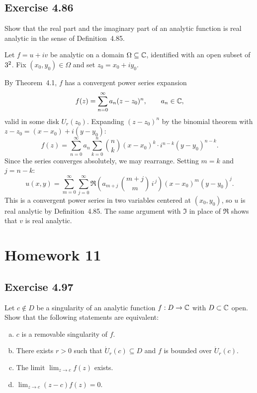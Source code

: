 \documentclass{article}
\begin{document}
\subsection{Exercise 4.86}

Show that the real part and the imaginary part of an analytic function
is real analytic in the sense of Definition~4.85.

\begin{solution}
  Let $f = u + iv$ be analytic on a domain $\Omega \subseteq \mathbb{C}$,
  identified with an open subset of $3^2$. Fix $(x_0, y_0) \in \Omega$
  and set $z_0 = x_0 + iy_0$.

  By Theorem~4.1, $f$ has a convergent power series expansion
  \[
    f(z) = \sum_{n=0}^{\infty} a_n (z - z_0)^n,
    \qquad a_n \in \mathbb{C},
  \]
  valid in some disk $U_r(z_0)$. Expanding $(z - z_0)^n$ by the
  binomial theorem with $z - z_0 = (x - x_0) + i(y - y_0)$:
  \[
    f(z) = \sum_{n=0}^{\infty} a_n
    \sum_{k=0}^{n} \binom{n}{k}
    (x - x_0)^k \cdot i^{n-k}(y - y_0)^{n-k}.
  \]
  Since the series converges absolutely, we may rearrange. Setting
  $m = k$ and $j = n - k$:
  \[
    u(x,y) = \sum_{m=0}^{\infty} \sum_{j=0}^{\infty}
    \Re\!\left(a_{m+j}\,\binom{m+j}{m}\,i^{\,j}\right)
    (x - x_0)^m (y - y_0)^j.
  \]
  This is a convergent power series in two variables centered at
  $(x_0, y_0)$, so $u$ is real analytic by Definition~4.85.
  The same argument with $\Im$ in place of $\Re$ shows that $v$ is
  real analytic.
\end{solution}

\section{Homework 11}

\subsection{Exercise 4.97}

Let $c \notin D$ be a singularity of an analytic function $f : D \to \mathbb{C}$ with
$D \subset \mathbb{C}$ open. Show that the following statements are equivalent:
\begin{enumerate}[(a)]
  \item $c$ is a removable singularity of $f$.
  \item There exists $r > 0$ such that $\dot{U}_r(c) \subseteq D$ and $f$ is bounded
    over $\dot{U}_r(c)$.
  \item The limit $\lim_{z \to c} f(z)$ exists.
  \item $\lim_{z \to c} (z - c)f(z) = 0$.
\end{enumerate}
\end{document}
